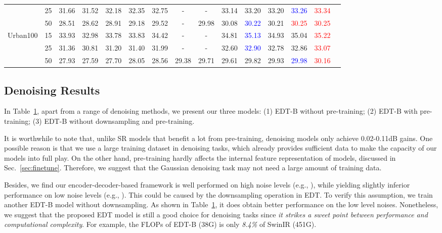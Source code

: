 \documentclass[runningheads]{llncs}
\begin{document}
\begin{table}[t]
\begin{center}
{\begin{tabular}{| c | c | c | c | c | c | c | c | c | c | c | c | c | c | c |}
					~ & 25 & 31.66 & 31.52 & 32.18 & 32.35 & 32.75 & - & - & 33.14 & 33.20 & 33.20 & \textcolor{blue}{33.26} & \textcolor{red}{33.34} \\
					~ & 50 & 28.51 & 28.62 & 28.91 & 29.18 & 29.52 & - & 29.98 & 30.08 & \textcolor{blue}{30.22} & 30.21 & \textcolor{red}{30.25} & \textcolor{red}{30.25} \\
					\hline
					\multirow{3}{*}{Urban100} & 15 & 33.93 & 32.98 & 33.78 & 33.83 & 34.42 & - & - & 34.81 & \textcolor{blue}{35.13} & 34.93 & 35.04 & \textcolor{red}{35.22} \\
					~ & 25 & 31.36 & 30.81 & 31.20 & 31.40 & 31.99 & - & - & 32.60 & \textcolor{blue}{32.90} & 32.78 & 32.86 & \textcolor{red}{33.07} \\
					~ & 50 & 27.93 & 27.59 & 27.70 & 28.05 & 28.56 & 29.38 & 29.71 & 29.61 & 29.82 & 29.93 & \textcolor{blue}{29.98} & \textcolor{red}{30.16} \\
					\hline
				\end{tabular}
			}
		\end{center}
		\vspace{-0.25in}
		\label{tab:denoise}
	\end{table}
	
	\subsection{Denoising Results}
	\label{sec:denoising}
	
	In Table~\ref{tab:denoise}, apart from a range of denoising methods, we present our three models: (1) EDT-B without pre-training; (2) EDT-B with pre-training; (3) EDT-B without downsampling and pre-training.
	
	It is worthwhile to note that, unlike SR models that benefit a lot from pre-training, denoising models only achieve 0.02-0.11dB gains. One possible reason is that we use a large training dataset in denoising tasks, which already provides sufficient data to make the capacity of our models into full play. On the other hand, pre-training hardly affects the internal feature representation of models, discussed in Sec.~\ref{sec:finetune}. Therefore, we suggest that the Gaussian denoising task may not need a large amount of training data.


	Besides, we find our encoder-decoder-based framework is well performed on high noise levels (e.g., ), while yielding slightly inferior performance on low noise levels (e.g., ). This could be caused by the downsampling operation in EDT. To verify this assumption, we train another EDT-B model without downsampling. As shown in Table~\ref{tab:denoise}, it does obtain better performance on the low level noises. Nonetheless, we suggest that the proposed EDT model is still a good choice for denoising tasks since \textit{it strikes a sweet point between performance and computational complexity}. For example, the FLOPs of EDT-B (38G) is only \textit{8.4\%} of SwinIR (451G).
	
\end{document}
